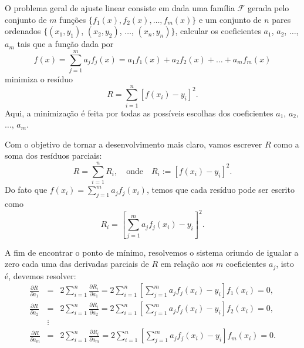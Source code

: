 O problema geral de ajuste linear consiste em dada uma família $\mathcal{F}$ gerada pelo conjunto de $m$ funções $\{f_1(x), f_2(x), \dotsc, f_m(x)\}$ e um conjunto de $n$ pares ordenados $\{(x_1, y_1)$, $(x_2, y_2)$, $\ldots$, $(x_n, y_n)\}$, calcular os coeficientes $a_1$, $a_2$, $\ldots$, $a_m$ tais que a função dada por
\begin{equation}
  f(x) = \sum_{j=1}^m a_jf_j(x) = a_1f_1(x)+a_2f_2(x)+\ldots+a_mf_m(x)
\end{equation}
minimiza o resíduo
\begin{equation}
  R= \sum_{i=1}^n \left[f(x_i)-y_i\right]^2.
\end{equation}
Aqui, a minimização é feita por todas as possíveis escolhas dos coeficientes $a_1$, $a_2$, $\ldots$, $a_m$.

Com o objetivo de tornar a desenvolvimento mais claro, vamos escrever $R$ como a soma dos resíduos parciais:
\begin{equation}
  R= \sum_{i=1}^n R_i,\quad \text{onde} \quad R_i := \left[f(x_i)-y_i\right]^2.
\end{equation}
Do fato que $f(x_i)=\sum_{j=1}^m a_jf_j(x_i)$, temos que cada resíduo pode ser escrito como
\begin{equation}
  R_i=  \left[\sum_{j=1}^m a_jf_j(x_i)-y_i\right]^2.
\end{equation}

A fim de encontrar o ponto de mínimo, resolvemos o sistema oriundo de igualar a zero cada uma das derivadas parciais de $R$ em relação aos $m$ coeficientes $a_j$, isto é, devemos resolver:
\begin{eqnarray}
\frac{\partial R}{\partial a_1} &=& 2 \sum_{i=1}^n \frac{\partial R_i}{\partial a_1} = 2\sum_{i=1}^n \left[\sum_{j=1}^m a_jf_j(x_i)-y_i\right] f_1(x_i)=0,\\
\frac{\partial R}{\partial a_2} &=& 2 \sum_{i=1}^n \frac{\partial R_i}{\partial a_2}=2\sum_{i=1}^n \left[\sum_{j=1}^m a_jf_j(x_i)-y_i\right] f_2(x_i)=0,\\
&\vdots&\\
\frac{\partial R}{\partial a_m} &=& 2 \sum_{i=1}^n \frac{\partial R_i}{\partial a_m}= 2\sum_{i=1}^n \left[\sum_{j=1}^m a_jf_j(x_i)-y_i\right] f_m(x_i)=0.
\end{eqnarray}

